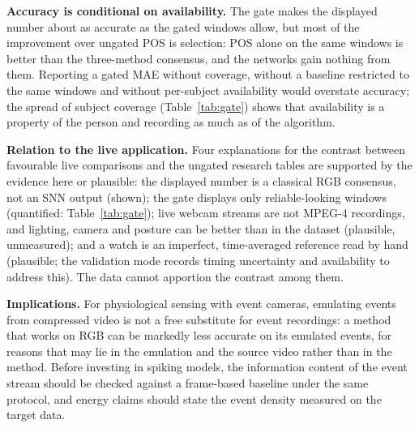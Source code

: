 \documentclass[10pt,journal]{IEEEtran}
\begin{document}
\textbf{Accuracy is conditional on availability.} The gate makes the displayed number about as accurate as the gated windows allow, but most of the improvement over ungated POS is selection: POS alone on the same windows is better than the three-method consensus, and the networks gain nothing from them. Reporting a gated MAE without coverage, without a baseline restricted to the same windows and without per-subject availability would overstate accuracy; the spread of subject coverage (Table~\ref{tab:gate}) shows that availability is a property of the person and recording as much as of the algorithm.

\textbf{Relation to the live application.} Four explanations for the contrast between favourable live comparisons and the ungated research tables are supported by the evidence here or plausible: the displayed number is a classical RGB consensus, not an SNN output (shown); the gate displays only reliable-looking windows (quantified: Table~\ref{tab:gate}); live webcam streams are not MPEG-4 recordings, and lighting, camera and posture can be better than in the dataset (plausible, unmeasured); and a watch is an imperfect, time-averaged reference read by hand (plausible; the validation mode records timing uncertainty and availability to address this). The data cannot apportion the contrast among them.

\textbf{Implications.} For physiological sensing with event cameras, emulating events from compressed video is not a free substitute for event recordings: a method that works on RGB can be markedly less accurate on its emulated events, for reasons that may lie in the emulation and the source video rather than in the method. Before investing in spiking models, the information content of the event stream should be checked against a frame-based baseline under the same protocol, and energy claims should state the event density measured on the target data.
\end{document}
